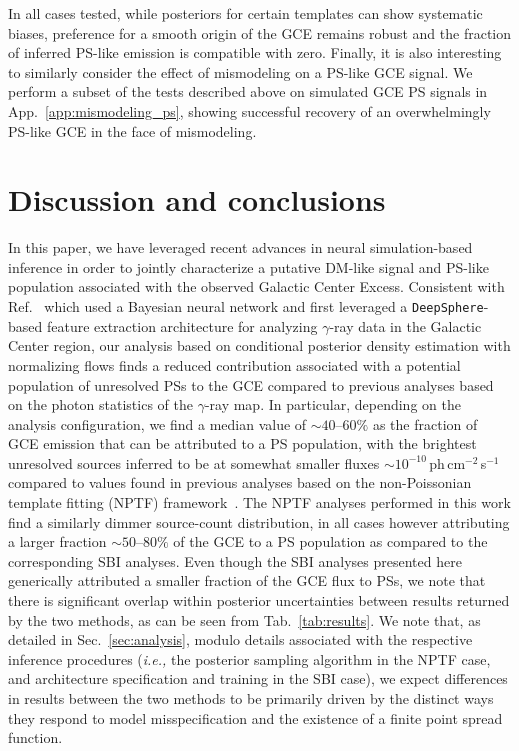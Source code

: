 \documentclass[prd,aps,10pt,nofootinbib,twocolumn,superscriptaddress,preprintnumbers,balancelastpage,longbibliography,floatfix]{revtex4-2}
\newcommand{\changes}[1]{{{\color{red}#1}}}
\begin{document}
\bigskip

In all cases tested, while posteriors for certain templates can show systematic biases, preference for a smooth origin of the GCE remains robust and the fraction of inferred PS-like emission is compatible with zero. Finally, it is also interesting to similarly consider the effect of mismodeling on a PS-like GCE signal. We perform a subset of the tests described above on simulated GCE PS signals in App.~\ref{app:mismodeling_ps}, showing successful recovery of an overwhelmingly PS-like GCE in the face of mismodeling.

\section{Discussion and conclusions}
\label{sec:conclusion}

In this paper, we have leveraged recent advances in neural simulation-based inference in order to jointly characterize a putative DM-like signal and PS-like population associated with the observed \Fermi Galactic Center Excess. Consistent with Ref.~\cite{List:2020mzd} which used a Bayesian neural network and first leveraged a \texttt{DeepSphere}-based feature extraction architecture for analyzing $\gamma$-ray data in the Galactic Center region, our analysis based on conditional posterior density estimation with normalizing flows finds a reduced contribution associated with a potential population of unresolved PSs to the GCE compared to previous analyses based on the photon statistics of the $\gamma$-ray map. In particular, depending on the analysis configuration, we find a median value of $\sim40$--$60\%$ as the fraction of GCE emission that can be attributed to a PS population, with the brightest unresolved sources inferred to be at somewhat smaller fluxes $\sim 10^{-10}$\,ph\,cm$^{-2}$\,s$^{-1}$ compared to values found in previous analyses based on the non-Poissonian template fitting (NPTF) framework~\cite{Lee:2015fea}. The NPTF analyses performed in this work find a similarly dimmer source-count distribution, in all cases however attributing a larger fraction $\sim50$--$80\%$ of the GCE to a PS population as compared to the corresponding SBI analyses. Even though the SBI analyses presented here generically attributed a smaller fraction of the GCE flux to PSs, we note that there is significant overlap within posterior uncertainties between results returned by the two methods, as can be seen from Tab.~\ref{tab:results}. \changes{We note that, as detailed in Sec.~\ref{sec:analysis}, modulo details associated with the respective inference procedures (\emph{i.e.,} the posterior sampling algorithm in the NPTF case, and architecture specification and training in the SBI case), we expect differences in results between the two methods to be primarily driven by the distinct ways they respond to model misspecification and the existence of a finite point spread function.}
\end{document}
